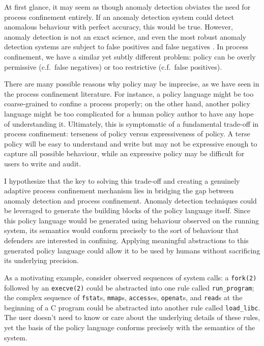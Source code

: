 \documentclass[dvipsnames, 12pt]{article}
\begin{document}
At first glance, it may seem as though anomaly detection obviates the need for
process confinement entirely. If an anomaly detection system could detect
anomalous behaviour with perfect accuracy, this would be true. However, anomaly
detection is not an exact science, and even the most robust anomaly detection
systems are subject to false positives and false negatives
\cite{forrest2008_evolution}. In process confinement, we have a similar yet
subtly different problem: policy can be overly permissive (c.f.~false negatives)
or too restrictive (c.f.~false positives).

There are many possible reasons why policy may be imprecise, as we have seen in
the process confinement literature. For instance, a policy language might be too
coarse-grained to confine a process properly; on the other hand, another policy
language might be too complicated for a human policy author to have any hope of
understanding it. Ultimately, this is symptomatic of a fundamental trade-off in
process confinement: terseness of policy versus expressiveness of policy. A terse
policy will be easy to understand and write but may not be expressive enough to
capture all possible behaviour, while an expressive policy may be difficult
for users to write and audit.

I hypothesize that the key to solving this trade-off and creating a genuinely
adaptive process confinement mechanism lies in bridging the gap between anomaly
detection and process confinement. Anomaly detection techniques could be
leveraged to generate the building blocks of the policy language itself. Since
this policy language would be generated using behaviour observed on the running
system, its semantics would conform precisely to the sort of behaviour that
defenders are interested in confining. Applying meaningful abstractions to this
generated policy language could allow it to be used by humans without
sacrificing its underlying precision.

As a motivating example, consider observed sequences of system calls:
a \texttt{fork(2)} followed by an \texttt{execve(2)} could be abstracted into
one rule called \texttt{run\_program}; the complex sequence of \texttt{fstat}s,
\texttt{mmap}s, \texttt{access}es, \texttt{openat}s, and \texttt{read}s at
the beginning of a C program could be abstracted into another rule called
\texttt{load\_libc}. The user doesn't need to know or care about the underlying
details of these rules, yet the basis of the policy language conforms precisely
with the semantics of the system.
\end{document}
